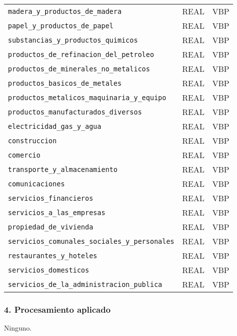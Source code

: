 \documentclass[12pt,a4paper]{article}
\begin{document}
\begin{longtable}{@{}lll@{}}
\texttt{madera\_y\_productos\_de\_madera}      & REAL                 & VBP \\
\texttt{papel\_y\_productos\_de\_papel}        & REAL                 & VBP \\
\texttt{substancias\_y\_productos\_quimicos}    & REAL                 & VBP \\
\texttt{productos\_de\_refinacion\_del\_petroleo} & REAL               & VBP \\
\texttt{productos\_de\_minerales\_no\_metalicos}& REAL                 & VBP \\
\texttt{productos\_basicos\_de\_metales}       & REAL                 & VBP \\
\texttt{productos\_metalicos\_maquinaria\_y\_equipo} & REAL            & VBP \\
\texttt{productos\_manufacturados\_diversos}    & REAL                 & VBP \\
\texttt{electricidad\_gas\_y\_agua}            & REAL                 & VBP \\
\texttt{construccion}                          & REAL                 & VBP \\
\texttt{comercio}                              & REAL                 & VBP \\
\texttt{transporte\_y\_almacenamiento}         & REAL                 & VBP \\
\texttt{comunicaciones}                        & REAL                 & VBP \\
\texttt{servicios\_financieros}                & REAL                 & VBP \\
\texttt{servicios\_a\_las\_empresas}           & REAL                 & VBP \\
\texttt{propiedad\_de\_vivienda}               & REAL                 & VBP \\
\texttt{servicios\_comunales\_sociales\_y\_personales} & REAL         & VBP \\
\texttt{restaurantes\_y\_hoteles}              & REAL                 & VBP \\
\texttt{servicios\_domesticos}                 & REAL                 & VBP \\
\texttt{servicios\_de\_la\_administracion\_publica} & REAL            & VBP \\
\end{longtable}

\subsubsection*{4. Procesamiento aplicado}
Ninguno.
\end{document}
